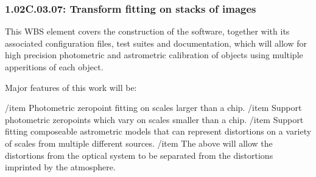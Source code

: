 \subsubsection{1.02C.03.07: Transform fitting on stacks of images}

This WBS element covers the construction of the software, together with
its associated configuration files, test suites and documentation, which
will allow for high precision photometric and astrometric calibration of 
objects using multiple apperitions of each object.  

Major features of this work will be:
\begin{itemize}

/item Photometric zeropoint fitting on scales larger than a chip.
/item Support photometric zeropoints which vary on scales smaller than a chip.
/item Support fitting composeable astrometric models that can represent
distortions on a variety of scales from multiple different sources.
/item The above will allow the distortions from the optical system to be
separated from the distortions imprinted by the atmosphere.

\end{itemize}
